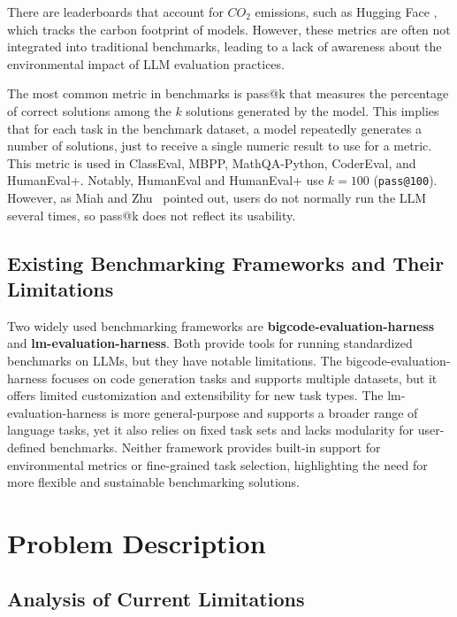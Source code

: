 There are leaderboards that account for $CO_2$ emissions, such as Hugging Face \cite{huggingfaceCalculation}, which tracks the carbon footprint of models. However, these metrics are often not integrated into traditional benchmarks, leading to a lack of awareness about the environmental impact of LLM evaluation practices.

The most common metric in benchmarks is pass@k that measures the percentage of correct solutions among the $k$ solutions generated by the model.
This implies that for each task in the benchmark dataset, a model repeatedly generates a number of solutions, just to receive a single numeric result to use for a metric.
This metric is used in ClassEval, MBPP, MathQA-Python, CoderEval, and HumanEval+.
Notably, HumanEval and HumanEval+ use $k=100$ (\texttt{pass@100}).
However, as Miah and Zhu~\cite{miah2024usercentricevaluationcode} pointed out, users do not normally run the LLM several times, so pass@k does not reflect its usability.

\section{Existing Benchmarking Frameworks and Their Limitations}


Two widely used benchmarking frameworks are \textbf{bigcode-evaluation-harness} and \textbf{lm-evaluation-harness}. Both provide tools for running standardized benchmarks on LLMs, but they have notable limitations. The bigcode-evaluation-harness focuses on code generation tasks and supports multiple datasets, but it offers limited customization and extensibility for new task types. The lm-evaluation-harness is more general-purpose and supports a broader range of language tasks, yet it also relies on fixed task sets and lacks modularity for user-defined benchmarks. Neither framework provides built-in support for environmental metrics or fine-grained task selection, highlighting the need for more flexible and sustainable benchmarking solutions.

\chapter{Problem Description}

\section{Analysis of Current Limitations}

